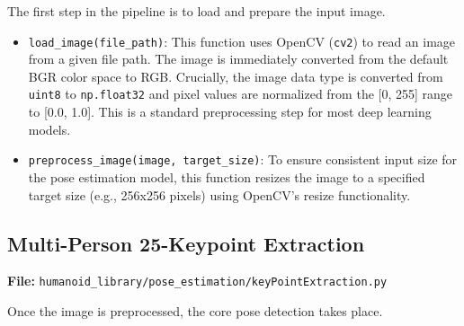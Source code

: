 \documentclass{article}
\begin{document}
The first step in the pipeline is to load and prepare the input image.

\begin{itemize}
    \item \texttt{load_image(file_path)}: This function uses OpenCV (\texttt{cv2}) to read an image from a given file path. The image is immediately converted from the default BGR color space to RGB. Crucially, the image data type is converted from \texttt{uint8} to \texttt{np.float32} and pixel values are normalized from the [0, 255] range to [0.0, 1.0]. This is a standard preprocessing step for most deep learning models.
    
    \item \texttt{preprocess_image(image, target_size)}: To ensure consistent input size for the pose estimation model, this function resizes the image to a specified target size (e.g., 256x256 pixels) using OpenCV's resize functionality.
\end{itemize}

\subsection{Multi-Person 25-Keypoint Extraction}
\textbf{File:} \texttt{humanoid_library/pose_estimation/keyPointExtraction.py}

Once the image is preprocessed, the core pose detection takes place.
\end{document}
